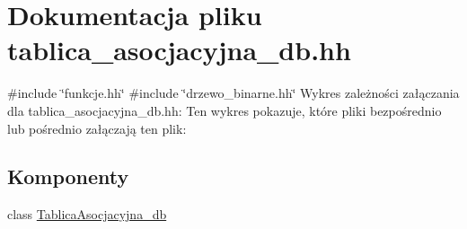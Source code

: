 \hypertarget{tablica__asocjacyjna__db_8hh}{\section{\-Dokumentacja pliku tablica\-\_\-asocjacyjna\-\_\-db.\-hh}
\label{tablica__asocjacyjna__db_8hh}
}
{\ttfamily \#include \char`\"{}funkcje.\-hh\char`\"{}}\*
{\ttfamily \#include \char`\"{}drzewo\-\_\-binarne.\-hh\char`\"{}}\*
\-Wykres zależności załączania dla tablica\-\_\-asocjacyjna\-\_\-db.\-hh\-:
\-Ten wykres pokazuje, które pliki bezpośrednio lub pośrednio załączają ten plik\-:
\subsection*{\-Komponenty}
\begin{DoxyCompactItemize}
\item 
class \hyperlink{class_tablica_asocjacyjna__db}{\-Tablica\-Asocjacyjna\-\_\-db}
\end{DoxyCompactItemize}
